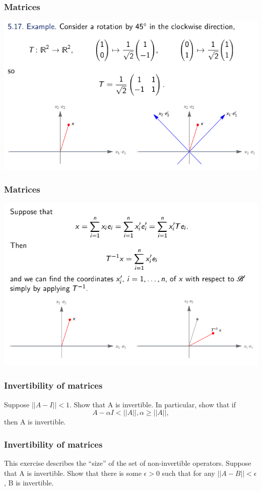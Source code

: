 \documentclass[12pt, t]{beamer}
\begin{document}
\begin{frame}
    \frametitle{Matrices}
    \begin{center}
        \includegraphics[width=\textwidth]{11}
    \end{center}
\end{frame}
\begin{frame}
    \frametitle{Matrices}
    \begin{center}
        \includegraphics[width=\textwidth]{12}
    \end{center}
\end{frame}

\begin{frame}
    \frametitle{Invertibility of matrices}
Suppose  $||A - I|| < 1$. Show that A is invertible. In particular, show that if 
\[
    A - \alpha  I < ||A||, \alpha \geq ||A||,
\]
then A is invertible.
\end{frame}


\begin{frame}
    \frametitle{Invertibility of matrices}
    This exercise describes the “size” of the set of non-invertible operators.
    Suppose that A is invertible. Show that there is some $\epsilon > 0$ such that for any
    $||A-B|| < \epsilon$ , B is invertible.
\end{frame}
\end{document}
